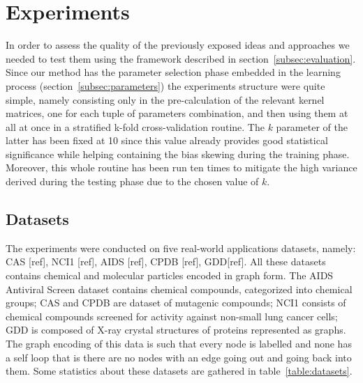
\chapter{Experiments}
\label{Chapter4}

In order to assess the quality of the previously exposed ideas and approaches we
needed to test them using the framework described in section~\ref{subsec:evaluation}. 
Since our method has the parameter selection phase embedded in the learning
process (section~\ref{subsec:parameters}) the experiments structure were quite
simple, namely consisting only in the pre-calculation of the relevant kernel
matrices, one for each tuple of parameters combination, and then using them at
all at once in a stratified k-fold cross-validation routine.
The $k$ parameter of the latter has been fixed at 10 since this value already
provides good statistical significance while helping containing the bias
skewing during the training phase.
Moreover, this whole routine has been run ten times to mitigate the high
variance derived during the testing phase due to the chosen value of $k$.

\section{Datasets}
\label{subsec:datasets}

The experiments were conducted on five real-world applications datasets, namely:
CAS [ref], NCI1 [ref], AIDS [ref], CPDB [ref], GDD[ref]. All these datasets
contains chemical and molecular particles encoded in graph form.
The AIDS Antiviral Screen dataset contains chemical compounds, categorized
into chemical groups; CAS and CPDB are dataset of mutagenic
compounds; NCI1 consists of chemical compounds screened for activity against 
non-small lung cancer cells; GDD is composed of X-ray crystal structures of
proteins represented as graphs.
The graph encoding of this data is such that every node is labelled and none
has a self loop that is there are no nodes with an edge going out and going back
into them.
Some statistics about these datasets are gathered in table~\ref{table:datasets}.

